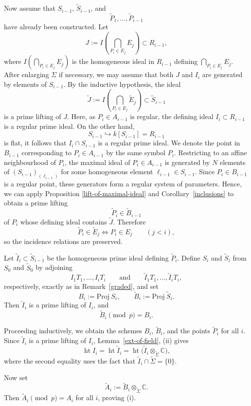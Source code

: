 \documentclass[a4paper]{amsart}
\def\CC{{\mathbb{C}}}
\newcommand{\proj}{{\mathrm{Proj\ }}}
\newcommand{\we}{{\widetilde E}}
\newcommand{\wB}{{\widetilde{B}}}
\newcommand{\wa}{{\widetilde{A}}}
\newcommand{\tP}{{\widetilde{P}}}
\theoremstyle{definition}
\begin{document}
Now assume that $S_{i-1}$, $\widetilde S_{i-1}$, and
\[
\tP_1,\dots,\tP_{i-1}
\]
have already been constructed. Let
\[
J:=I\!\left(\bigcap_{P_i\in E_j}E_j\right)\subset R_{i-1},
\]
where $I(\bigcap_{P_i\in E_j}E_j)$ is the homogeneous ideal in $R_{i-1}$ defining $\bigcap_{P_i\in E_j}E_j$.
After enlarging $\Sigma$ if necessary, we may assume that both $J$ and $I_i$
are generated by elements of $S_{i-1}$. By the inductive hypothesis, the ideal
\[
\widetilde J:=I\!\left(\bigcap_{P_i\in E_j}\we_j\right)
\subset \widetilde S_{i-1}
\]
is a prime lifting of $J$. 
Here, as $P_i\in A_{i-1}$ is regular, the defining ideal $I_i\subset R_{i-1}$ is a regular prime ideal.
On the other hand, 
$$S_{i-1}\hookrightarrow k[S_{i-1}]=R_{i-1}$$ 
is flat, it follows that $I_i\cap S_{i-1}$ is a regular prime ideal.
We denote the point in $B_{i-1}$ corresponding to $P_i\in A_{i-1}$ by the same symbol $P_i$.
Restricting to an affine neighbourhood of $P_i$, the
maximal ideal of $P_i\in A_{i-1}$ is generated by $N$ elements 
of $(S_{i-1})_{(\ell_{i-1})}$ for some homogeneous element $\ell_{i-1}\in S_{i-1}$.
Since $P_i\in B_{i-1}$ is
a regular point, these generators form a regular system of parameters.  %
%
Hence, we can apply Proposition \ref{lift-of-maximal-ideal}
and Corollary~\ref{inclusions} to obtain a prime lifting
\[
\tP_i\in \wB_{i-1}
\]
of $P_i$ whose defining ideal contains $\widetilde J$. Therefore
\[
\tP_i\in \we_j
\iff
P_i\in E_j
\qquad (j<i),
\]
so the incidence relations are preserved.

Let $\widetilde I_i\subset \widetilde S_{i-1}$ be the homogeneous prime ideal
defining $\tP_i$. Define $S_i$ and $\widetilde S_i$ from $S_0$ and
$\widetilde S_0$ by adjoining
\[
I_1T_1,\dots,I_iT_i
\qquad\text{and}\qquad
\widetilde I_1T_1,\dots,\widetilde I_iT_i,
\]
respectively, exactly as in Remark~\ref{graded}, and set
\[
B_i:=\proj S_i,\qquad \wB_i:=\proj \widetilde S_i.
\]
Then $\widetilde I_i$ is a prime lifting of $I_i$, and
\[
\wB_i\pmod p=B_i.
\]

Proceeding inductively, we obtain the schemes $B_i$, $\wB_i$, and the
points $\tP_i$ for all $i$. Since $\widetilde I_i$ is a prime lifting of
$I_i$, Lemma~\ref{ext-of-field}, (ii)  gives
\[
\operatorname{ht} I_i
=
\operatorname{ht} \widetilde I_i
=
\operatorname{ht}\bigl(\widetilde I_i\otimes_{\widetilde\Sigma}\CC\bigr),
\]
where the second equality uses the fact that
$\widetilde I_i\cap \widetilde\Sigma=\{0\}$.

Now set
\[
\wa_i:=\wB_i\otimes_{\widetilde\Sigma}\CC.
\]
Then $\wa_i\pmod p=A_i$ for all $i$, proving {\rm (i)}.
\end{document}
